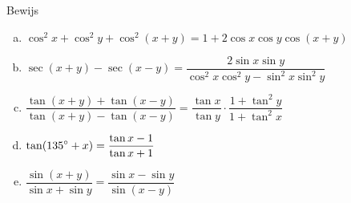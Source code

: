 \documentclass[twoside,a4paper,12pt]{article}
\begin{document}
\begin{oefening}
Bewijs
\begin{enumerate}[(a)]
\itemsep.8em
  \item $\displaystyle \cos^2 x + \cos^2 y + \cos^2(x+y) = 1 + 2\cos x \cos y \cos(x+y)$
  \item $\displaystyle \sec(x+y) - \sec(x-y) = \dfrac{2\sin x \sin y}{\cos^2 x \cos^2 y - \sin^2 x \sin^2 y}$
  \item $\displaystyle \dfrac{\tan(x+y) + \tan(x-y)}{\tan(x+y) - \tan(x-y)} = \dfrac{\tan x}{\tan y}\cdot\dfrac{1+\tan^2 y}{1 + \tan^2 x}$
  \item $\displaystyle \tan(135^\circ + x) = \dfrac{\tan x - 1}{\tan x + 1}$
  \item $\displaystyle \dfrac{\sin(x+y)}{\sin x + \sin y} = \dfrac{\sin x - \sin y}{\sin(x-y)}$
\end{enumerate}
\end{oefening}
\end{document}
